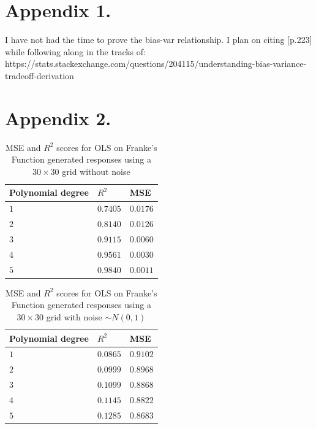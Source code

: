\documentclass[%
oneside,                 %
final,                   %
10pt]{article}
\begin{document}
\begin{appendices}
\section*{Appendix 1.} \label{APP_1}
I have not had the time to prove the bias-var relationship. I plan on citing \citep{HastieTrevor2009TEoS}[p.223] while following along in the tracks of: https://stats.stackexchange.com/questions/204115/understanding-bias-variance-tradeoff-derivation

\section*{Appendix 2.} \label{APP_2}
\begin{table}[h!]
\begin{center}
\begin{tabular}{lll}
\hline
 Polynomial degree   & $R^2$      & MSE        \\
\hline
 $ 1 $               & $ 0.7405 $ & $ 0.0176 $ \\
 $ 2 $               & $ 0.8140 $ & $ 0.0126 $ \\
 $ 3 $               & $ 0.9115 $ & $ 0.0060 $ \\
 $ 4 $               & $ 0.9561 $ & $ 0.0030 $ \\
 $ 5 $               & $ 0.9840 $ & $ 0.0011 $ \\
\hline
\end{tabular}
\end{center}
\caption{MSE and $R^2$ scores for OLS on  Franke's Function generated responses using a $30\times 30$ grid without noise}
\label{table:OLS_mse_r2}
\end{table}

\begin{table}[h!]
\begin{center}
\begin{tabular}{lll}
\hline
 Polynomial degree   & $R^2$      & MSE        \\
\hline
 $ 1 $               & $ 0.0865 $ & $ 0.9102 $ \\
 $ 2 $               & $ 0.0999 $ & $ 0.8968 $ \\
 $ 3 $               & $ 0.1099 $ & $ 0.8868 $ \\
 $ 4 $               & $ 0.1145 $ & $ 0.8822 $ \\
 $ 5 $               & $ 0.1285 $ & $ 0.8683 $ \\
\hline
\end{tabular}
\end{center}
\caption{MSE and $R^2$ scores for OLS on  Franke's Function generated responses using a $30\times 30$ grid with noise $\sim N(0,1)$ }
\label{table:OLS_mse_r2}
\end{table}



\end{appendices}
\end{document}
